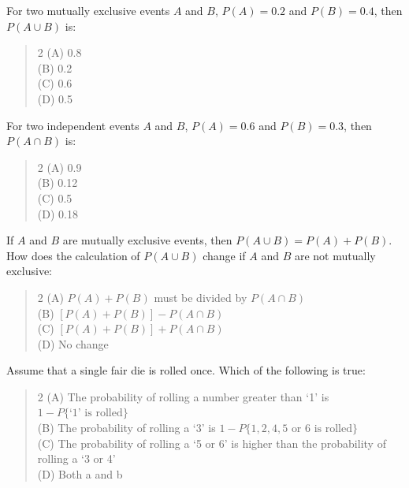 \documentclass[11pt,a4paper]{article}
\begin{document}
\begin{mcqlist}
\item For two mutually exclusive events $A$ and $B$, $P(A)=0.2$ and $P(B)=0.4$, then $P(A\cup B)$ is:
\begin{quote}\begin{multicols}{2}
\noindent (A) 0.8 \\
(B) 0.2 \\
(C) 0.6 \\
(D) 0.5
\end{multicols}\end{quote}

\item For two independent events $A$ and $B$, $P(A)=0.6$ and $P(B)=0.3$, then $P(A\cap B)$ is:
\begin{quote}\begin{multicols}{2}
\noindent (A) 0.9 \\
(B) 0.12 \\
(C) 0.5 \\
(D) 0.18
\end{multicols}\end{quote}

\item If $A$ and $B$ are mutually exclusive events, then $P(A\cup B)=P(A)+P(B)$. How does the calculation of $P(A\cup B)$ change if $A$ and $B$ are not mutually exclusive:
\begin{quote}\begin{multicols}{2}
\noindent (A) $P(A)+P(B)$ must be divided by $P(A\cap B)$ \\
(B) $[P(A)+P(B)]-P(A\cap B)$ \\
(C) $[P(A)+P(B)]+P(A\cap B)$ \\
(D) No change
\end{multicols}\end{quote}

\item Assume that a single fair die is rolled once. Which of the following is true:
\begin{quote}\begin{multicols}{2}
\noindent (A) The probability of rolling a number greater than `1' is $1-P\{\text{`1' is rolled}\}$ \\
(B) The probability of rolling a `3' is $1-P\{1,2,4,5\text{ or }6\text{ is rolled}\}$ \\
(C) The probability of rolling a `5 or 6' is higher than the probability of rolling a `3 or 4' \\
(D) Both a and b
\end{multicols}\end{quote}


\end{mcqlist}
\end{document}
